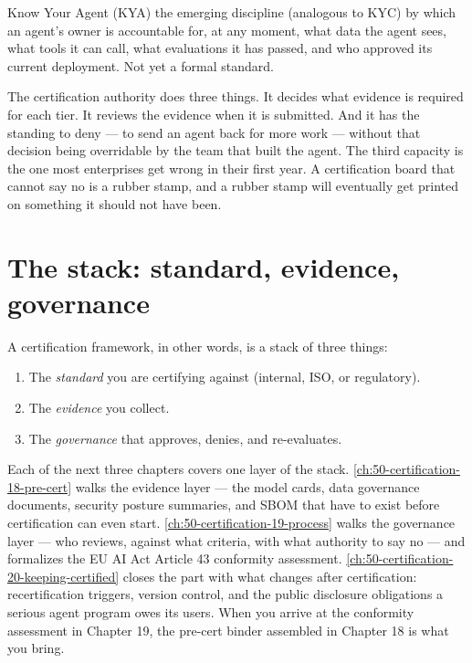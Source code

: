 \begin{TNdefinition}{Know Your Agent (KYA)} the emerging discipline (analogous to KYC) by which an agent's owner is accountable for, at any moment, what data the agent sees, what tools it can call, what evaluations it has passed, and who approved its current deployment. Not yet a formal standard. \end{TNdefinition}

The certification authority does three things. It decides what evidence is required for each tier. It reviews the evidence when it is submitted. And it has the standing to deny --- to send an agent back for more work --- without that decision being overridable by the team that built the agent. The third capacity is the one most enterprises get wrong in their first year. A certification board that cannot say no is a rubber stamp, and a rubber stamp will eventually get printed on something it should not have been.

\section{The stack: standard, evidence, governance}

A certification framework, in other words, is a stack of three things:

\begin{enumerate}
\item The \textit{standard} you are certifying against (internal, ISO, or regulatory).
\item The \textit{evidence} you collect.
\item The \textit{governance} that approves, denies, and re-evaluates.
\end{enumerate}

Each of the next three chapters covers one layer of the stack. \autoref{ch:50-certification-18-pre-cert} walks the evidence layer --- the model cards, data governance documents, security posture summaries, and SBOM that have to exist before certification can even start. \autoref{ch:50-certification-19-process} walks the governance layer --- who reviews, against what criteria, with what authority to say no --- and formalizes the EU AI Act Article 43 conformity assessment. \autoref{ch:50-certification-20-keeping-certified} closes the part with what changes after certification: recertification triggers, version control, and the public disclosure obligations a serious agent program owes its users. When you arrive at the conformity assessment in Chapter 19, the pre-cert binder assembled in Chapter 18 is what you bring.

